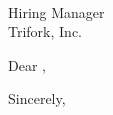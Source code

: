 \documentclass[10pt,letter]{letter}
\def\hm{} %
\def\company{Trifork} %
\begin{document}
\begin{letter}{\hm \\ Hiring Manager \\ \company, Inc.  }

\opening{Dear \hm,}

\setlength\parindent{.5in}





\closing{Sincerely,}
\end{letter}
\end{document}
